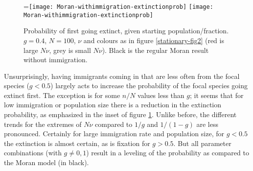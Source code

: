 \begin{figure}[ht]
	\centering
	=\hbox{\texttt{[image: Moran-withimmigration-extinctionprob]}}
	\texttt{[image: Moran-withimmigration-extinctionprob]}
	\caption{Probability of first going extinct, given starting population/fraction. $g=0.4$, $N=100$, $\nu$ and colours as in figure \ref{stationary-fig2} (red is large $N\nu$, grey is small $N\nu$). Black is the regular Moran result without immigration. } \label{extnprobfig-ihope}
\end{figure}
\iffalse
\begin{figure}[ht]
	\centering
	\texttt{[image: Moran-withimmigration-extinctionprob]}
	\caption{Probability of first going extinct, given starting population/fraction. $g=0.4$, $N=100$, $\nu$ and colours as in figure \ref{stationary-fig2}. Black is the regular Moran result without immigration. } \label{extnprobfig}
\end{figure}
\begin{figure}[ht]
	\centering
	\texttt{[image: Moran-withimmigration-extinctionprob-zoomed]}
	\caption{Probability of first going extinct, given starting population/fraction. $g=0.4$, $N=100$, $\nu$ and colours as in figure \ref{stationary-fig2}. Black is the regular Moran result without immigration. }
\end{figure}
\fi

Unsurprisingly, having immigrants coming in that are less often from the focal species ($g<0.5$) largely acts to increase the probability of the focal species going extinct first. %
The exception is for some $n/N$ values less than $g$; it seems that for low immigration or population size there is a reduction in the extinction probability, as emphasized in the inset of figure \ref{extnprobfig-ihope}. 
Unlike before, the different trends for the extremes of $N\nu$ compared to $1/g$ and $1/(1-g)$ are less pronounced. 
Certainly for large immigration rate and population size, for $g<0.5$ the extinction is almost certain, as is fixation for $g>0.5$. 
But all parameter combinations (with $g\neq 0,1$) result in a leveling of the probability as compared to the Moran model (in black). %

